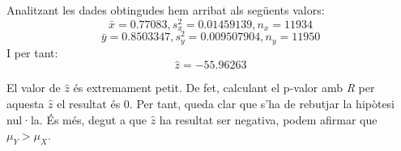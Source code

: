 Analitzant les dades obtingudes hem arribat als següents valors:
$$\bar{x} = 0.77083, s^2_x = 0.01459139, n_x = 11934$$
$$\bar{y} = 0.8503347, s^2_y = 0.009507904, n_y = 11950$$
I per tant:
$$\hat{z} = -55.96263$$


El valor de $\hat{z}$ és extremament petit. De fet, calculant el p-valor amb \emph{R} per aquesta $\hat{z}$ el resultat és 0. Per tant, queda clar que s'ha de rebutjar la hipòtesi nul·la. És més, degut a que $\hat{z}$ ha resultat ser negativa, podem afirmar que $\mu_Y > \mu_X$.